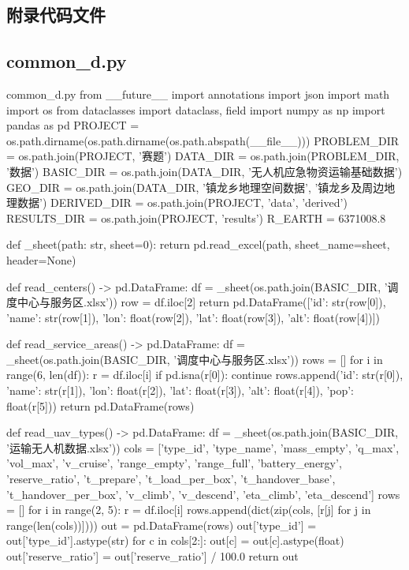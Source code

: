 \documentclass[bwprint]{gmcmthesis}
\begin{document}
\begin{appendices}
\section{附录代码文件}

\subsection{common\_d.py}

\begin{Python}{common\_d.py}
from __future__ import annotations
import json
import math
import os
from dataclasses import dataclass, field
import numpy as np
import pandas as pd
PROJECT = os.path.dirname(os.path.dirname(os.path.abspath(__file__)))
PROBLEM_DIR = os.path.join(PROJECT, '赛题')
DATA_DIR = os.path.join(PROBLEM_DIR, '数据')
BASIC_DIR = os.path.join(DATA_DIR, '无人机应急物资运输基础数据')
GEO_DIR = os.path.join(DATA_DIR, '镇龙乡地理空间数据', '镇龙乡及周边地理数据')
DERIVED_DIR = os.path.join(PROJECT, 'data', 'derived')
RESULTS_DIR = os.path.join(PROJECT, 'results')
R_EARTH = 6371008.8

def _sheet(path: str, sheet=0):
    return pd.read_excel(path, sheet_name=sheet, header=None)

def read_centers() -> pd.DataFrame:
    df = _sheet(os.path.join(BASIC_DIR, '调度中心与服务区.xlsx'))
    row = df.iloc[2]
    return pd.DataFrame([{'id': str(row[0]), 'name': str(row[1]), 'lon': float(row[2]), 'lat': float(row[3]), 'alt': float(row[4])}])

def read_service_areas() -> pd.DataFrame:
    df = _sheet(os.path.join(BASIC_DIR, '调度中心与服务区.xlsx'))
    rows = []
    for i in range(6, len(df)):
        r = df.iloc[i]
        if pd.isna(r[0]):
            continue
        rows.append({'id': str(r[0]), 'name': str(r[1]), 'lon': float(r[2]), 'lat': float(r[3]), 'alt': float(r[4]), 'pop': float(r[5])})
    return pd.DataFrame(rows)

def read_uav_types() -> pd.DataFrame:
    df = _sheet(os.path.join(BASIC_DIR, '运输无人机数据.xlsx'))
    cols = ['type_id', 'type_name', 'mass_empty', 'q_max', 'vol_max', 'v_cruise', 'range_empty', 'range_full', 'battery_energy', 'reserve_ratio', 't_prepare', 't_load_per_box', 't_handover_base', 't_handover_per_box', 'v_climb', 'v_descend', 'eta_climb', 'eta_descend']
    rows = []
    for i in range(2, 5):
        r = df.iloc[i]
        rows.append(dict(zip(cols, [r[j] for j in range(len(cols))])))
    out = pd.DataFrame(rows)
    out['type_id'] = out['type_id'].astype(str)
    for c in cols[2:]:
        out[c] = out[c].astype(float)
    out['reserve_ratio'] = out['reserve_ratio'] / 100.0
    return out


\end{Python}
\end{appendices}
\end{document}
